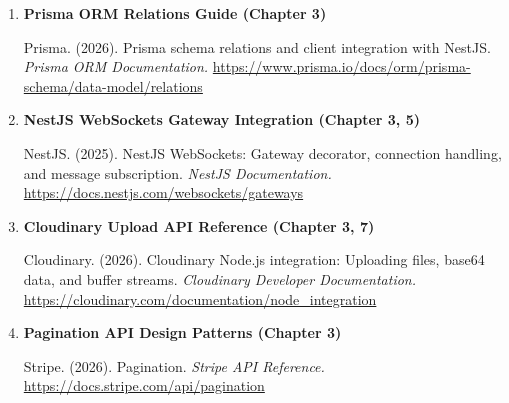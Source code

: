 \begin{enumerate}[leftmargin=*, label=\arabic*., itemsep=0.8em]
  \item \textbf{Prisma ORM Relations Guide (Chapter 3)}

  Prisma. (2026). Prisma schema relations and client integration with NestJS. \textit{Prisma ORM Documentation.} \url{https://www.prisma.io/docs/orm/prisma-schema/data-model/relations}

  \item \textbf{NestJS WebSockets Gateway Integration (Chapter 3, 5)}

  NestJS. (2025). NestJS WebSockets: Gateway decorator, connection handling, and message subscription. \textit{NestJS Documentation.} \url{https://docs.nestjs.com/websockets/gateways}

  \item \textbf{Cloudinary Upload API Reference (Chapter 3, 7)}

  Cloudinary. (2026). Cloudinary Node.js integration: Uploading files, base64 data, and buffer streams. \textit{Cloudinary Developer Documentation.} \url{https://cloudinary.com/documentation/node_integration}

  \item \textbf{Pagination API Design Patterns (Chapter 3)}

  Stripe. (2026). Pagination. \textit{Stripe API Reference.} \url{https://docs.stripe.com/api/pagination}

\end{enumerate}

